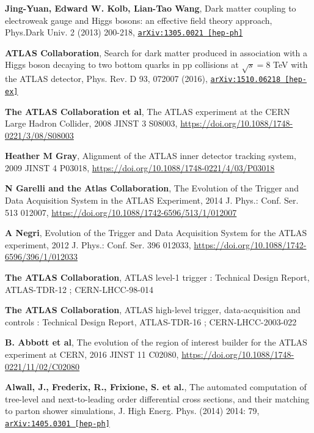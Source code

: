 \documentclass[11pt,a4paper,openright,twoside]{report}
\begin{document}
\begin{thebibliography}{9}
\textbf{Jing-Yuan, Edward W. Kolb, Lian-Tao Wang}, Dark matter coupling to electroweak gauge and Higgs bosons: an effective field theory approach, Phys.Dark Univ. 2 (2013) 200-218, \href{https://arxiv.org/abs/1305.0021}{\texttt{arXiv:1305.0021 [hep-ph]}}

\textbf{ATLAS Collaboration}, Search for dark matter produced in association with a Higgs boson decaying to two bottom quarks in pp collisions at $\sqrt{s} = 8$ TeV with the ATLAS detector, Phys. Rev. D 93, 072007 (2016), \href{https://arxiv.org/abs/1510.06218}{\texttt{arXiv:1510.06218 [hep-ex]}}

\textbf{The ATLAS Collaboration et al}, The ATLAS experiment at the CERN Large Hadron Collider, 2008 JINST 3 S08003, \url{https://doi.org/10.1088/1748-0221/3/08/S08003}

\textbf{Heather M Gray}, Alignment of the ATLAS inner detector tracking system, 2009 JINST 4 P03018, \url{https://doi.org/10.1088/1748-0221/4/03/P03018}

\textbf{N Garelli and the Atlas Collaboration}, The Evolution of the Trigger and Data Acquisition System in the ATLAS Experiment, 2014 J. Phys.: Conf. Ser. 513 012007, \url{https://doi.org/10.1088/1742-6596/513/1/012007}

\textbf{A Negri}, Evolution of the Trigger and Data Acquisition System for the ATLAS experiment, 2012 J. Phys.: Conf. Ser. 396 012033, \url{https://doi.org/10.1088/1742-6596/396/1/012033}

\textbf{The ATLAS Collaboration}, ATLAS level-1 trigger : Technical Design Report, 	ATLAS-TDR-12 ; CERN-LHCC-98-014

\textbf{The ATLAS Collaboration}, ATLAS high-level trigger, data-acquisition and controls : Technical Design Report, ATLAS-TDR-16 ; CERN-LHCC-2003-022

\textbf{B. Abbott et al}, The evolution of the region of interest builder for the ATLAS experiment at CERN, 2016 JINST 11 C02080, \url{https://doi.org/10.1088/1748-0221/11/02/C02080}

\textbf{Alwall, J., Frederix, R., Frixione, S. et al.}, The automated computation of tree-level and next-to-leading order differential cross sections, and their matching to parton shower simulations, J. High Energ. Phys. (2014) 2014: 79, \href{https://arxiv.org/abs/1405.0301}{\texttt{arXiv:1405.0301 [hep-ph]}}


\end{thebibliography}
\end{document}
